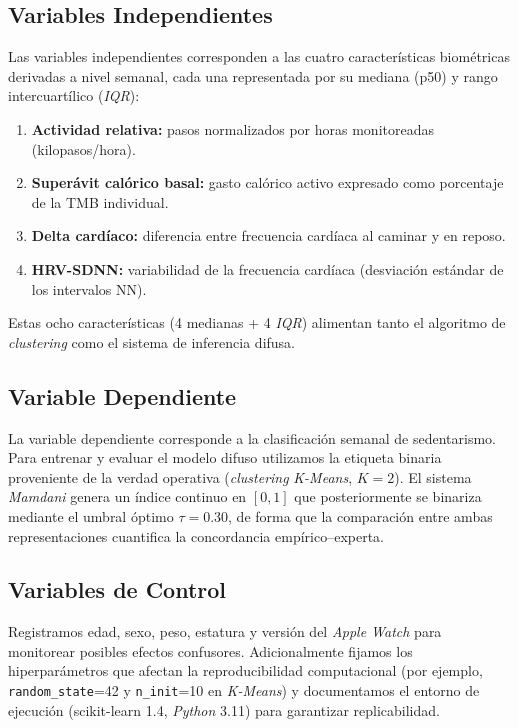 \subsection{Variables Independientes}
\label{subsec:variables_independientes}

Las variables independientes corresponden a las cuatro características biométricas derivadas a nivel semanal, cada una representada por su mediana (p50) y rango intercuartílico (\textit{IQR}):
\begin{enumerate}[noitemsep]
    \item \textbf{Actividad relativa:} pasos normalizados por horas monitoreadas (kilopasos/hora).
    \item \textbf{Superávit calórico basal:} gasto calórico activo expresado como porcentaje de la TMB individual.
    \item \textbf{Delta cardíaco:} diferencia entre frecuencia cardíaca al caminar y en reposo.
    \item \textbf{HRV-SDNN:} variabilidad de la frecuencia cardíaca (desviación estándar de los intervalos NN).
\end{enumerate}
Estas ocho características (4 medianas + 4 \textit{IQR}) alimentan tanto el algoritmo de \textit{clustering} como el sistema de inferencia difusa.

\subsection{Variable Dependiente}
\label{subsec:variable_dependiente}

La variable dependiente corresponde a la clasificación semanal de sedentarismo. Para entrenar y evaluar el modelo difuso utilizamos la etiqueta binaria proveniente de la verdad operativa (\textit{clustering} \textit{K-Means}, $K=2$). El sistema \textit{Mamdani} genera un índice continuo en $[0,1]$ que posteriormente se binariza mediante el umbral óptimo $\tau=0.30$, de forma que la comparación entre ambas representaciones cuantifica la concordancia empírico--experta.

\subsection{Variables de Control}
\label{subsec:variables_control}

Registramos edad, sexo, peso, estatura y versión del \textit{Apple Watch} para monitorear posibles efectos confusores. Adicionalmente fijamos los hiperparámetros que afectan la reproducibilidad computacional (por ejemplo, \texttt{random\_state}=42 y \texttt{n\_init}=10 en \textit{K-Means}) y documentamos el entorno de ejecución (scikit-learn 1.4, \textit{Python} 3.11) para garantizar replicabilidad.

